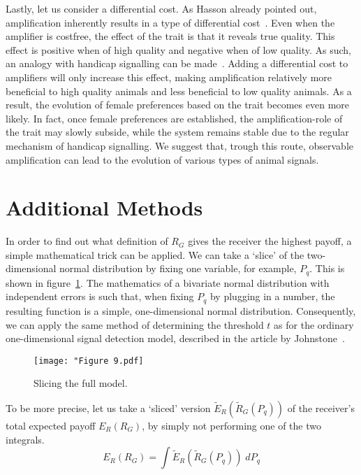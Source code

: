 \documentclass[a4paper,12pt]{article}
\numberwithin{equation}{section}
\numberwithin{figure}{section}
\begin{document}
Lastly, let us consider a differential cost. As Hasson already pointed out, amplification inherently results in a type of differential cost~\cite{Hasson1989}. Even when the amplifier is costfree, the effect of the trait is that it reveals true quality. This effect is positive when of high quality and negative when of low quality. As such, an analogy with handicap signalling can be made~\cite{Zahavi1975}. Adding a differential cost to amplifiers will only increase this effect, making amplification relatively more beneficial to high quality animals and less beneficial to low quality animals. As a result, the evolution of female preferences based on the trait becomes even more likely. In fact, once female preferences are established, the amplification-role of the trait may slowly subside, while the system remains stable due to the regular mechanism of handicap signalling. We suggest that, trough this route, observable amplification can lead to the evolution of various types of animal signals.

\newpage


\section{Additional Methods}
\label{sec:Additional Methods}

In order to find out what definition of $R_{G}$ gives the receiver the highest payoff, a simple mathematical trick can be applied. We can take a `slice' of the two-dimensional normal distribution by fixing one variable, for example, $P_{q}$. This is shown in figure~\ref{fig:Figure 9.pdf}. The mathematics of a bivariate normal distribution with independent errors is such that, when fixing $P_{q}$ by plugging in a number, the resulting function is a simple, one-dimensional normal distribution. Consequently, we can apply the same method of determining the threshold $t$ as for the ordinary one-dimensional signal detection model, described in the article by Johnstone~\cite{Johnstone1997}.

\begin{figure}[!h]
\begin{center}
\leavevmode
\texttt{[image: "Figure 9.pdf]}
\caption[]{Slicing the full model.}
\label{fig:Figure 9.pdf}
\end{center}
\end{figure}

To be more precise, let us take a `sliced' version $\tilde{E}_{R}(\tilde{R}_{G}(P_{q}))$ of the receiver's total expected payoff $E_{R}(R_{G})$, by simply not performing one of the two integrals.
\begin{equation}
\label{eq:CueDetectionModelwithObservableAmplification/SlicedPayoffR}
E_{R}(R_{G}) = \displaystyle \int \tilde{E}_{R}(\tilde{R}_{G}(P_{q})) \; dP_{q}
\end{equation}
\end{document}

